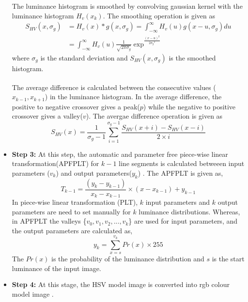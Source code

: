 \begin{itemize}
		The luminance histogram is smoothed by convolving gaussian kernel \cite{ACE} with the luminance histogram $H_v(x_k)$. The smoothing operation is given as
		\begin{equation}\label{gausseq}
		\begin{split}		
		S_{HV}(x,\sigma_g)&=H_v(x)*g(x,\sigma_g)=\int_{-\infty}^{\infty} 	H_v(u)g(x-u,\sigma_g)du\\
		&=\int_{-\infty}^{\infty} 	H_v(u) \frac{1}{\sqrt{2\pi\sigma_g}} \exp^\frac{(x-u)^2}{2{\sigma_g}^2}
		\end{split}
		\end{equation}
		where $\sigma_g$ is the standard deviation and $S_{HV}(x,\sigma_g)$ is the smoothed histogram.
		
		\paragraph*{}The average difference is calculated between the consecutive values ($x_{k-1}, x_{k+1}$) in the luminance histogram. In the average difference, the positive to negative crossover gives a peak($p$) while the negative to positive crossover gives a valley($v$). The avergae difference operation is given as
		\begin{equation}\label{smootheq}
		S_{HV}(x)=\frac{1}{\sigma_g - 1}\sum_{i=1}^{\sigma_g - 1}\frac{S_{HV}(x+i)-S_{HV}(x-i)}{2\times i}
		\end{equation}
		\item{\textbf{Step 3:}} At this step, the automatic and parameter free piece-wise linear transformation(APFPLT) for $k-1$ line segments is calculated betweeen input parameters ($v_k$) and output parameters($y_k$) \cite{ACE}. The APFPLT is given as,
		\begin{equation}\label{PLTeq}
			T_{k-1} =\frac{(y_k-y_{k-1})}{x_k-x_{k-1}} \times {(x-x_{k-1})} +y_{k-1}
		\end{equation}
		In piece-wise linear transformation (PLT), $k$ input parameters and $k$ output parameters are need to set manually for $k$ luminance distributions. Whereas, in APFPLT the valleys \{$v_0,v_1,v_2,...,v_k$\} are used for input parameters, and the output parameters are calculated as, 
		\begin{equation}\label{probeq}
			y_k = \sum_{x=s}^{v_k} Pr(x) \times 255	
		\end{equation}  
		The $Pr(x)$ is the probability of the luminance distribution and $s$ is the start luminance of the input image.
		\item {\textbf{Step 4:}} At this stage, the HSV model image is converted into rgb colour model image \cite{ACE}. 
\end{itemize}

